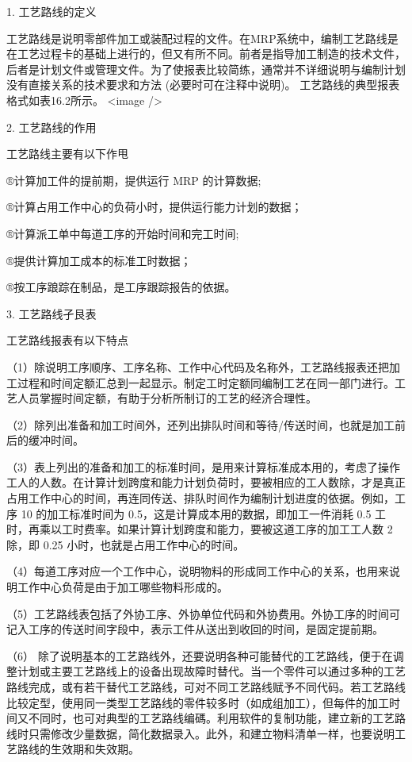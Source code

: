 1. 工艺路线的定义

    工艺路线是说明零部件加工或装配过程的文件。在MRP系统中，编制工艺路线是在工艺过程卡的基础上进行的，但又有所不同。前者是指导加工制造的技术文件，后者是计划文件或管理文件。为了使报表比较简练，通常并不详细说明与编制计划没有直接关系的技术要求和方法 (必要时可在注释中说明)。
    工艺路线的典型报表格式如表16.2所示。
    <image />

2. 工艺路线的作用

    工艺路线主要有以下作甩

    ®计算加工件的提前期，提供运行 MRP 的计算数据;

    ®计算占用工作中心的负荷小时，提供运行能力计划的数据；

    ®计算派工单中每道工序的开始时间和完工时间;

    ®提供计算加工成本的标准工时数据；

    ®按工序踉踪在制品，是工序跟踪报告的依据。

3. 工艺路线孑艮表

    工艺路线报表有以下特点

    （1）除说明工序顺序、工序名称、工作中心代码及名称外，工艺路线报表还把加工过程和时间定额汇总到一起显示。制定工时定额同编制工艺在同一部门进行。工艺人员掌握时间定额，有助于分析所制订的工艺的经济合理性。

    （2）除列出准备和加工时间外，还列出排队时间和等待/传送时间，也就是加工前后的缓冲时间。

    （3）表上列出的准备和加工的标准时间，是用来计算标准成本用的，考虑了操作工人的人数。在计算计划跨度和能力计划负荷时，要被相应的工人数除，才是真正占用工作中心的时间，再连同传送、排队时间作为编制计划进度的依据。例如，工序 10 的加工标准时间为 0.5，这是计算成本用的数据，即加工一件消耗 0.5 工时，再乘以工时费率。如果计算计划跨度和能力，要被这道工序的加工工人数 2 除，即 0.25 小时，也就是占用工作中心的时间。

    （4）每道工序对应一个工作中心，说明物料的形成同工作中心的关系，也用来说明工作中心负荷是由于加工哪些物料形成的。

    （5）工艺路线表包括了外协工序、外协单位代码和外协费用。外协工序的时间可记入工序的传送时间字段中，表示工件从送出到收回的时间，是固定提前期。

    （6） 除了说明基本的工艺路线外，还要说明各种可能替代的工艺路线，便于在调整计划或主要工艺路线上的设备出现故障时替代。当一个零件可以通过多种的工艺路线完成，或有若干替代工艺路线，可对不同工艺路线赋予不同代码。若工艺路线比较定型，使用同一类型工艺路线的零件较多时（如成组加工），但每件的加工时间又不同时，也可对典型的工艺路线编碼。利用软件的复制功能，建立新的工艺路线时只需修改少量数据，简化数据录入。此外，和建立物料清单一样，也要说明工艺路线的生效期和失效期。

